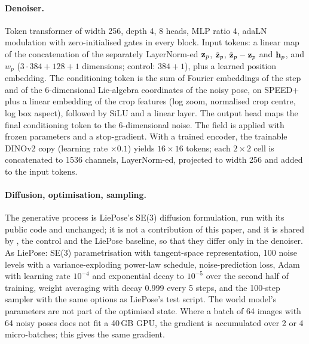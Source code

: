 \paragraph{Denoiser.}
Token transformer of width 256, depth 4, 8 heads, MLP ratio 4, adaLN modulation with zero-initialised gates in every block. Input
tokens: a linear map of the concatenation of the separately LayerNorm-ed $\mathbf{z}_p$, $\hat{\mathbf{z}}_p$, $\hat{\mathbf{z}}_p-\mathbf{z}_p$ and $\mathbf{h}_p$, and $w_p$
($3\cdot384+128+1$ dimensions; control: $384+1$), plus a learned position embedding. The conditioning token is the sum of Fourier embeddings
of the step and of the 6-dimensional Lie-algebra coordinates of the noisy pose, on SPEED+ plus a linear embedding of the crop features
(log zoom, normalised crop centre, log box aspect), followed by SiLU and a linear layer. The output head maps the final conditioning
token to the 6-dimensional noise. The field is applied with frozen parameters and a stop-gradient. With a trained encoder, the
trainable DINOv2 copy (learning rate $\times0.1$) yields $16\times16$ tokens; each $2\times2$ cell is concatenated to 1536 channels,
LayerNorm-ed, projected to width 256 and added to the input tokens.

\paragraph{Diffusion, optimisation, sampling.}
The generative process is LiePose's SE(3) diffusion formulation, run with its public code and unchanged; it is not a contribution of
this paper, and it is shared by \method, the control and the LiePose baseline, so that they differ only in the denoiser. As LiePose:
SE(3) parametrisation with tangent-space representation, 100 noise levels with a variance-exploding power-law schedule, noise-prediction loss,
Adam with learning rate $10^{-4}$ and exponential decay to $10^{-5}$ over the second half of training, weight averaging with decay
0.999 every 5 steps, and the 100-step sampler with the same options as LiePose's test script. The world model's parameters are not
part of the optimised state. Where a batch of 64 images with 64 noisy poses does not fit a 40\,GB GPU, the gradient is accumulated over
2 or 4 micro-batches; this gives the same gradient.

